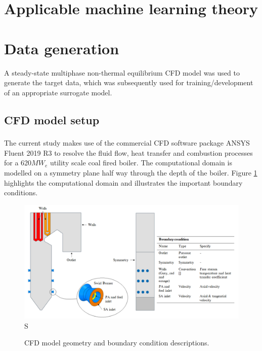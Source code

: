 \documentclass[a4paper,fleqn]{cas-sc}
\begin{document}



\section{Applicable machine learning theory}

\section{Data generation}
A steady-state multiphase non-thermal equilibrium CFD model was used to generate the target data, which was subsequently used for training/development of an appropriate surrogate model.

\subsection{CFD model setup}
The current study makes use of the commercial CFD software package ANSYS\textsuperscript{\textregistered} Fluent 2019 R3 to resolve the fluid flow, heat transfer and combustion processes for a 620$MW_e$ utility scale coal fired boiler. The computational domain is modelled on a symmetry plane half way through the depth of the boiler. Figure \ref{fig_cfd_geom_bc} highlights the computational domain and illustrates the important boundary conditions.\\ 

\begin{figure}[h!]
	\centering
		\includegraphics[scale=0.5]{CFD_GEOMETRY}S
	  \caption{CFD model geometry and boundary condition descriptions.}\label{fig_cfd_geom_bc}
\end{figure}
\end{document}

